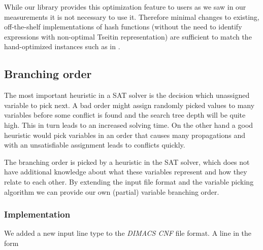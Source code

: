 While our library provides this optimization feature to users as we saw in our measurements it is not necessary to use it.
Therefore minimal changes to existing, off-the-shelf implementations of hash functions (without the need to identify expressions with non-optimal Tseitin representation) are sufficient to match the hand-optimized instances such as in \cite{nossum2012sat}.



\subsection{Branching order}
\label{sec:branching-order}

The most important heuristic in a SAT solver is the decision which unassigned variable to pick next.
A bad order might assign randomly picked values to many variables before some conflict is found and the search tree depth will be quite high.
This in turn leads to an increased solving time.
On the other hand a good heuristic would pick variables in an order that causes many propagations and with an unsatisfiable assignment leads to conflicts quickly.

The branching order is picked by a heuristic in the SAT solver, which does not have additional knowledge about what these variables represent and how they relate to each other.
By extending the input file format and the variable picking algorithm we can provide our own (partial) variable branching order.

\subsubsection{Implementation}
\label{sec:branching-order-impl}
We added a new input line type to the \emph{DIMACS CNF} file format.
A line in the form

